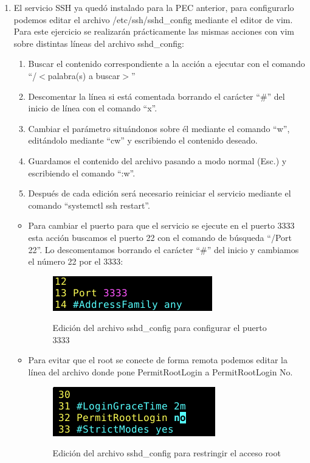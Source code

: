 \documentclass[10pt,a4paper]{article}
\begin{document}
\begin{enumerate}[label=\textbf{\alph*)}]
\item El servicio SSH ya quedó instalado para la PEC anterior, para configurarlo podemos editar el archivo /etc/ssh/sshd\_config mediante el editor de vim. Para este ejercicio se realizarán prácticamente las mismas acciones con vim sobre distintas líneas del archivo sshd\_config:
\begin{enumerate}[label=\arabic*.]
\item Buscar el contenido correspondiente a la acción a ejecutar con el comando ``/$<$palabra(s) a buscar$>$''
\item Descomentar la línea si está comentada borrando el carácter ``\#'' del inicio de línea con el comando ``x''.
\item Cambiar el parámetro situándonos sobre él mediante el comando ``w'', editándolo mediante ``cw'' y escribiendo el contenido deseado.
\item Guardamos el contenido del archivo pasando a modo normal (Esc.) y escribiendo el comando ``:w''.
\item Después de cada edición será necesario reiniciar el servicio mediante el comando ``systemctl ssh restart''.
\end{enumerate}
\begin{itemize}

\item Para cambiar el puerto para que el servicio se ejecute en el puerto 3333 esta acción buscamos el puerto 22 con el comando de búsqueda ``/Port 22''. Lo descomentamos borrando el carácter ``\#'' del inicio y cambiamos el número 22 por el 3333:

\begin{figure}[h!]
  \centering
  \includegraphics[scale=0.6]{ssh1.png}\\
  \caption{Edición del archivo sshd\_config para configurar el puerto 3333}
  \label{fig:port22}
\end{figure}

\item Para evitar que el root se conecte de forma remota podemos editar la línea del archivo donde pone PermitRootLogin a PermitRootLogin No.

\begin{figure}[h!]
  \centering
  \includegraphics[scale=0.6]{ssh2.png}\\
  \caption{Edición del archivo sshd\_config para restringir el acceso root}
  \label{fig:loginno}
\end{figure}
\pagebreak


\end{itemize}
\end{enumerate}
\end{document}
